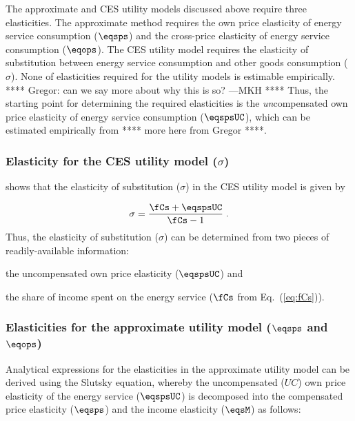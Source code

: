 The approximate and CES utility models discussed above
require three elasticities.
The approximate method requires 
the own price elasticity of energy service consumption ($\eqsps$) and
the cross-price elasticity of energy service consumption ($\eqops$).
The CES utility model requires the elasticity of substitution
between energy service consumption and other goods consumption ($\sigma$).
None of elasticities required for the utility models
is estimable empirically.
**** Gregor: can we say more about why this is so? ---MKH ****
Thus, the starting point for determining the required elasticities 
is the \textit{un}compensated own price elasticity 
of energy service consumption ($\eqspsUC$), 
which can be estimated empirically from
**** more here from Gregor ****. 


\subsubsection{Elasticity for the CES utility model ($\sigma$)} 
\label{sec:elasticity_ces}

\citet{Gortz1977} shows that
the elasticity of substitution ($\sigma$)
in the CES utility model is given by

\begin{equation} \label{eq:sigma}
  \sigma = \frac{\fCs + \eqspsUC}{\fCs - 1} \; .
\end{equation}
%
Thus, the elasticity of substitution ($\sigma$) 
can be determined from two pieces of readily-available information:
%
\begin{enumerate*}[label={(\alph*)}]
	
  \item the uncompensated own price elasticity ($\eqspsUC$) and 
  
  \item the share of income spent on the energy service ($\fCs$ 
        from Eq.~(\ref{eq:fCs})).

\end{enumerate*}


\subsubsection{Elasticities for the approximate utility model ($\eqsps$ and $\eqops$)} 
\label{sec:elasticities_approx}

Analytical expressions for the elasticities in the approximate utility model
can be derived using the Slutsky equation, 
whereby the uncompensated ($UC$) own price elasticity 
of the energy service ($\eqspsUC$) 
is decomposed into the compensated price elasticity ($\eqsps$) and
the income elasticity ($\eqsM$) as follows:

